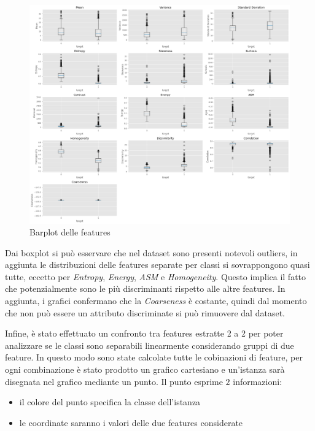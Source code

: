 \begin{figure}[!h]
      \centering
      \includegraphics[width=\textwidth]{img/analisi/boxplot.png}
      \caption{Barplot delle features}
      \label{fig:boxplot_features}
\end{figure}

Dai boxplot si può esservare che nel dataset sono presenti notevoli outliers, in
aggiunta le distribuzioni delle features separate per classi si sovrappongono
quasi tutte, eccetto per \textit{Entropy}, \textit{Energy}, \textit{ASM} e 
\textit{Homogeneity}. Questo implica il fatto che potenzialmente sono le più 
discriminanti rispetto alle altre features. In aggiunta, i grafici confermano 
che la \textit{Coarseness} è costante, quindi dal momento che non può essere un 
attributo discriminate si può rimuovere dal dataset.

Infine, è stato effettuato un confronto tra features estratte 2 a 2 per poter 
analizzare se le classi sono separabili linearmente considerando gruppi di due feature.
In questo modo sono state calcolate tutte le cobinazioni di feature, per ogni 
combinazione è stato prodotto un grafico cartesiano e un'istanza sarà disegnata 
nel grafico mediante un punto. Il punto esprime $2$ informazioni:
\begin{itemize}
      \item il colore del punto specifica la classe dell'istanza
      \item le coordinate saranno i valori delle due features considerate
\end{itemize} 

